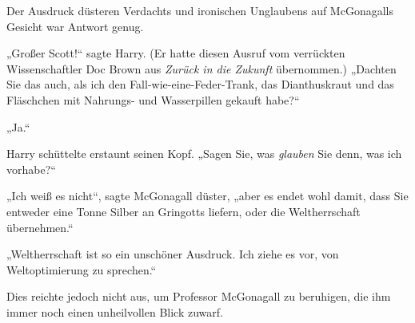 Der Ausdruck düsteren Verdachts und ironischen Unglaubens auf McGonagalls Gesicht war Antwort genug.

„Großer Scott!“ sagte Harry. (Er hatte diesen Ausruf vom verrückten Wissenschaftler Doc Brown aus \emph{Zurück in die Zukunft} übernommen.) „Dachten Sie das auch, als ich den Fall-wie-eine-Feder-Trank, das Dianthuskraut und das Fläschchen mit Nahrungs- und Wasserpillen gekauft habe?“

„Ja.“

Harry schüttelte erstaunt seinen Kopf. „Sagen Sie, was \emph{glauben} Sie denn, was ich vorhabe?“

„Ich weiß es nicht“, sagte McGonagall düster, „aber es endet wohl damit, dass Sie entweder eine Tonne Silber an Gringotts liefern, oder die Weltherrschaft übernehmen.“

„Weltherrschaft ist so ein unschöner Ausdruck. Ich ziehe es vor, von Weltoptimierung zu sprechen.“

Dies reichte jedoch nicht aus, um Professor McGonagall zu beruhigen, die ihm immer noch einen unheilvollen Blick zuwarf.

